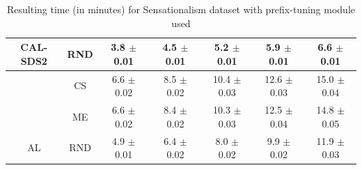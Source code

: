 \begin{table}[htbp]
\begin{tabular*}{\linewidth}{c|c|@{\extracolsep{\fill}}ccccc}
\multirow{-3}{*}{\raggedright\arraybackslash CAL-SDS2} & RND & 3.8 $\pm$ {\small 0.01} & 4.5 $\pm$ {\small 0.01} & 5.2 $\pm$ {\small 0.01} & 5.9 $\pm$ {\small 0.01} & 6.6 $\pm$ {\small 0.01}\\
\midrule
 & CS & 6.6 $\pm$ {\small 0.02} & 8.5 $\pm$ {\small 0.02} & 10.4 $\pm$ {\small 0.03} & 12.6 $\pm$ {\small 0.03} & 15.0 $\pm$ {\small 0.04}\\

 & ME & 6.6 $\pm$ {\small 0.02} & 8.4 $\pm$ {\small 0.02} & 10.3 $\pm$ {\small 0.03} & 12.5 $\pm$ {\small 0.04} & 14.8 $\pm$ {\small 0.05}\\

\multirow{-3}{*}{\raggedright\arraybackslash AL} & RND & 4.9 $\pm$ {\small 0.01} & 6.4 $\pm$ {\small 0.02} & 8.0 $\pm$ {\small 0.02} & 9.9 $\pm$ {\small 0.02} & 11.9 $\pm$ {\small 0.03}\\
\bottomrule
\end{tabular*}
\caption{Resulting time (in minutes) for Sensationalism dataset with prefix-tuning module used}
\label{tab:time_full_sensation_10_prefix}
\end{table}

